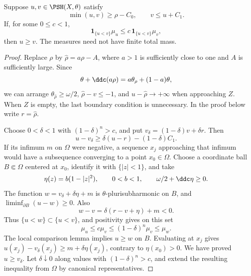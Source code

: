 \begin{theorem}\label{thm:big-barrier-domination}
Suppose $u,v\in\PSH(X,\theta)$ satisfy
\[
 \min(u,v)\geq\rho-C_0,\qquad v\leq u+C_1.
\]
If, for some $0\leq c<1$,
\[
 \mathbf1_{\{u<v\}}\mu_u\leq
 c\,\mathbf1_{\{u<v\}}\mu_v,
\]
then $u\geq v$. The measures need not have finite total mass.
\end{theorem}
\begin{proof}
Replace $\rho$ by $\widehat\rho=a\rho-A$, where $a>1$ is sufficiently close to one and $A$ is sufficiently large. Since
\[
 \theta+\ddc(a\rho)=a\theta_\rho+(1-a)\theta,
\]
we can arrange $\theta_{\widehat\rho}\geq\omega/2$, $\widehat\rho-v\leq-1$, and
$u-\widehat\rho\to+\infty$ when approaching $Z$. When $Z$ is empty, the last boundary condition is unnecessary. In the proof below write $r=\widehat\rho$.

Choose $0<\delta<1$ with $(1-\delta)^n>c$, and put $v_\delta=(1-\delta)v+\delta r$. Then
\[
 u-v_\delta\geq\delta(u-r)-(1-\delta)C_1.
\]
If its infimum $m$ on $\Omega$ were negative, a sequence $x_j$ approaching that infimum would have a subsequence converging to a point $x_0\in\Omega$. Choose a coordinate ball $B\Subset\Omega$ centered at $x_0$, identify it with $\{|z|<1\}$, and take
\[
 \eta(z)=b(1-|z|^2),\qquad 0<b<1,
 \qquad \omega/2+\ddc\eta\geq0.
\]
The function $w=v_\delta+\delta\eta+m$ is $\theta$-plurisubharmonic on $B$, and $\liminf_{\partial B}(u-w)\geq0$. Also
\[
 w-v=\delta(r-v+\eta)+m<0.
\]
Thus $\{u<w\}\subset\{u<v\}$, and positivity gives on this set
\[
 \mu_u\leq c\mu_v\leq(1-\delta)^n\mu_v\leq\mu_w.
\]
The local comparison lemma implies $u\geq w$ on $B$. Evaluating at $x_j$ gives $u(x_j)-v_\delta(x_j)\geq m+\delta\eta(x_j)$, contrary to $\eta(x_0)>0$. We have proved $u\geq v_\delta$. Let $\delta\downarrow0$ along values with $(1-\delta)^n>c$, and extend the resulting inequality from $\Omega$ by canonical representatives.
\end{proof}

